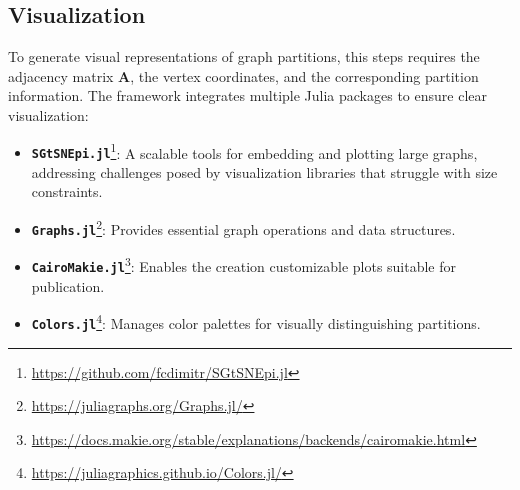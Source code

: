 \documentclass[../paper.tex]{subfiles}
\begin{document}
        
    
    \subsection{Visualization}
    \label{subsec:visu}
    To generate visual representations of graph partitions, this steps requires the adjacency matrix $\mathbf{A}$, the vertex coordinates, and the corresponding partition information. The framework integrates multiple Julia packages to ensure clear visualization:
    \begin{itemize}
        \item \textbf{\texttt{SGtSNEpi.jl}}\footnote{\url{https://github.com/fcdimitr/SGtSNEpi.jl}}: A scalable tools for embedding and plotting large graphs, addressing challenges posed by visualization libraries that struggle with size constraints.
        \item \textbf{\texttt{Graphs.jl}}\footnote{\url{https://juliagraphs.org/Graphs.jl/}}: Provides essential graph operations and data structures.
        \item \textbf{\texttt{CairoMakie.jl}}\footnote{\url{https://docs.makie.org/stable/explanations/backends/cairomakie.html}}: Enables the creation customizable plots suitable for publication.
        \item \textbf{\texttt{Colors.jl}}\footnote{\url{https://juliagraphics.github.io/Colors.jl/}}: Manages color palettes for visually distinguishing partitions.
    \end{itemize}
\end{document}
